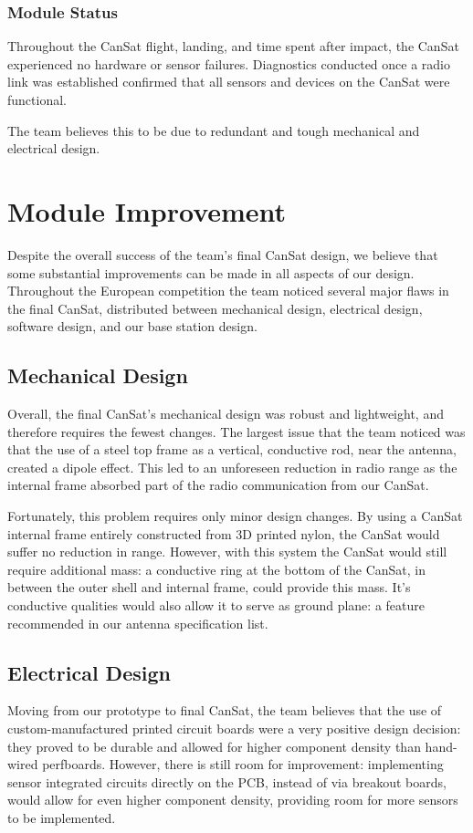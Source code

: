 \documentclass[]{report}
\begin{document}
	\subsection{Module Status}
	
	Throughout the CanSat flight, landing, and time spent after impact, the CanSat experienced no hardware or sensor failures. Diagnostics conducted once a radio link was established confirmed that all sensors and devices on the CanSat were functional.
	
	The team believes this to be due to redundant and tough mechanical and electrical design.
	
	\chapter{Module Improvement}
	Despite the overall success of the team's final CanSat design, we believe that some substantial improvements can be made in all aspects of our design. Throughout the European competition the team noticed several major flaws in the final CanSat, distributed between mechanical design, electrical design, software design, and our base station design.	
	
	\section{Mechanical Design}
	Overall, the final CanSat's mechanical design was robust and lightweight, and therefore requires the fewest changes. The largest issue that the team noticed was that the use of a steel top frame as a vertical, conductive rod, near the antenna, created a dipole effect. This led to an unforeseen reduction in radio range as the internal frame absorbed part of the radio communication from our CanSat.
	
	Fortunately, this problem requires only minor design changes. By using a CanSat internal frame entirely constructed from 3D printed nylon, the CanSat would suffer no reduction in range. However, with this system the CanSat would still require additional mass: a conductive ring at the bottom of the CanSat, in between the outer shell and internal frame, could provide this mass. It's conductive qualities would also allow it to serve as ground plane: a feature recommended in our antenna specification list.
	
	\section{Electrical Design}
	Moving from our prototype to final CanSat, the team believes that the use of custom-manufactured printed circuit boards were a very positive design decision: they proved to be durable and allowed for higher component density than hand-wired perfboards. However, there is still room for improvement: implementing sensor integrated circuits directly on the PCB, instead of via breakout boards, would allow for even higher component density, providing room for more sensors to be implemented.
	
\end{document}

